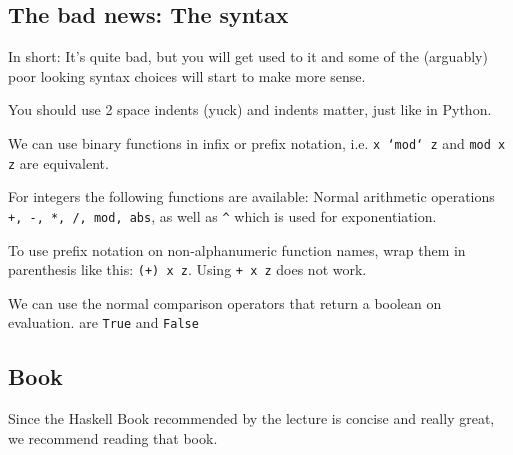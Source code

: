 \subsection{The bad news: The syntax}
In short: It's quite bad, but you will get used to it and some of the (arguably) poor looking syntax choices will start to make more sense.

You should use 2 space indents (yuck) and indents matter, just like in Python.

We can use binary functions in infix or prefix notation, i.e. \texttt{x `mod` z} and \texttt{mod x z} are equivalent.

For integers the following functions are available: Normal arithmetic operations \texttt{+, -, *, /, mod, abs}, as well as \texttt{\^} which is used for exponentiation.

To use prefix notation on non-alphanumeric function names, wrap them in parenthesis like this: \texttt{(+) x z}. Using \texttt{+ x z} does not work.

We can use the normal comparison operators that return a boolean on evaluation.  are \texttt{True} and \texttt{False}


\subsection{Book}
Since the Haskell Book recommended by the lecture is concise and really great, we recommend reading that book.
